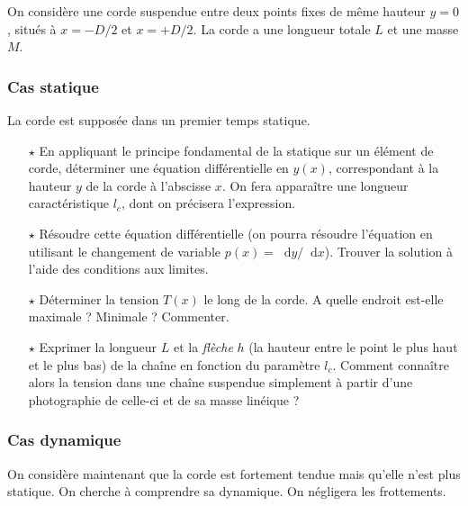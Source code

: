\documentclass{report}
\newcommand*\dif{\mathop{}\!\mathrm{d}}
\begin{document}
On considère une corde suspendue entre deux points fixes de même hauteur $y=0$, situés à $x=-D/2$ et $x=+D/2$. La corde a une longueur totale $L$ et une masse $M$.

\subsubsection{Cas statique}

La corde est supposée dans un premier temps statique.

\begin{itemize}

	\item[$\star$] En appliquant le principe fondamental de la statique sur un élément de corde, déterminer une équation différentielle en $y(x)$, correspondant à la hauteur $y$ de la corde à l'abscisse $x$. On fera apparaître une longueur caractéristique $l_c$, dont on précisera l'expression.
	
	\item[$\star$] Résoudre cette équation différentielle (on pourra résoudre l'équation en utilisant le changement de variable $p(x)=\dif y/\dif x$). Trouver la solution à l'aide des conditions aux limites. 
	
	\item[$\star$] Déterminer la tension $T(x)$ le long de la corde. A quelle endroit est-elle maximale ? Minimale ? Commenter. 
	
	\item[$\star$] Exprimer la longueur $L$ et la \textit{flèche} $h$ (la hauteur entre le point le plus haut et le plus bas) de la chaîne en fonction du paramètre $l_c$. Comment connaître alors la tension dans une chaîne suspendue simplement à partir d'une photographie de celle-ci et de sa masse linéique ?
	
\end{itemize}

\subsubsection*{Cas dynamique}

On considère maintenant que la corde est fortement tendue mais qu'elle n'est plus statique. On cherche à comprendre sa dynamique. On négligera les frottements.
\end{document}

